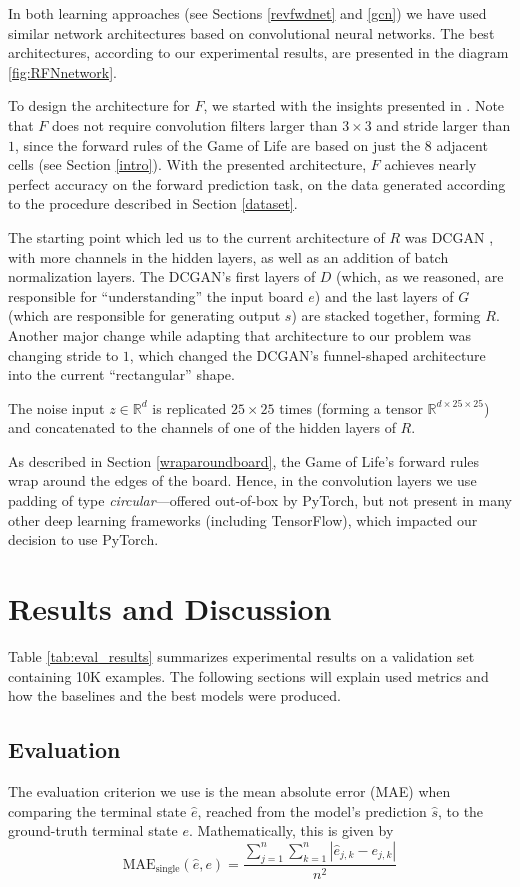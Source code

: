 \documentclass[conference]{IEEEtran}
\begin{document}
In both learning approaches (see Sections \ref{revfwdnet} and \ref{gcn}) we have used similar network architectures based on convolutional neural networks. The best architectures, according to our experimental results, are presented in the diagram \ref{fig:RFNnetwork}.

To design the architecture for $F$, we started with the insights presented in \cite{springer2020its}. Note that $F$ does not require convolution filters larger than $3 \times 3$ and stride larger than $1$, since the forward rules of the Game of Life are based on just the 8 adjacent cells (see Section \ref{intro}). With the presented architecture, $F$ achieves nearly perfect accuracy on the forward prediction task, on the data generated according to the procedure described in Section \ref{dataset}.

The starting point which led us to the current architecture of $R$ was DCGAN \cite{radford2016unsupervised}, with more channels in the hidden layers, as well as an addition of batch normalization layers. The DCGAN's first layers of $D$ (which, as we reasoned, are responsible for ``understanding'' the input board $e$) and the last layers of $G$ (which are responsible for generating output $s$) are stacked together, forming $R$. Another major change while adapting that architecture to our problem was changing stride to $1$, which changed the DCGAN's funnel-shaped architecture into the current ``rectangular'' shape. 

The noise input $z \in \mathbb{R}^d$ is replicated $25 \times 25$ times (forming a tensor $\mathbb{R}^{d\times25\times25}$) and concatenated to the channels of one of the hidden layers of $R$.

As described in Section \ref{wraparoundboard}, the Game of Life's forward rules wrap around the edges of the board. Hence, in the convolution layers we use padding of type {\it circular}---offered out-of-box by PyTorch, but not present in many other deep learning frameworks (including TensorFlow), which impacted our decision to use PyTorch.


\section{Results and Discussion}
\label{results}
Table \ref{tab:eval_results} summarizes experimental results on a validation set containing 10K examples. The following sections will explain used metrics and how the baselines and the best models were produced.

\subsection{Evaluation}
\label{evaluation}
The evaluation criterion we use is the mean absolute error (MAE) when comparing the terminal state $\hat{e}$, reached from the model's prediction $\hat{s}$, to the ground-truth terminal state $e$. Mathematically, this is given by
$$\mathrm{MAE}_{\text{single}}(\hat e, e) = \frac{ \sum_{j=1}^{n}\sum_{k=1}^{n}|\hat e_{j,k} - e_{j,k}|}{n^2}$$
\end{document}
